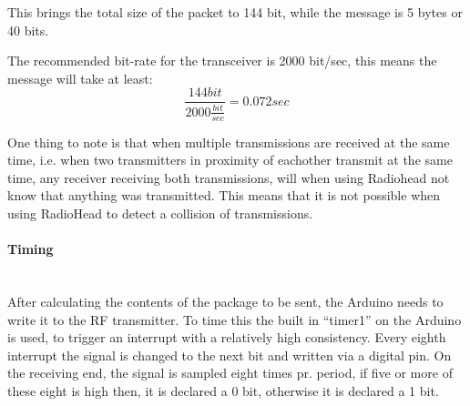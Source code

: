 \begin{table}[ht]
\centering
{}
\caption{A table view of the content of transmitting \enquote{Hello} with RadioHead.}
\label{table:RH}
\end{table}

This brings the total size of the packet to 144 bit, while the message is 5 bytes or 40 bits.

The recommended bit-rate for the transceiver is 2000 bit/sec, this means the message will take at least:
\begin{equation}
\frac{144 bit}{2000 \frac{bit}{sec}} = 0.072 sec
\end{equation}

One thing to note is that when multiple transmissions are received at the same time, i.e. when two transmitters in proximity of eachother transmit at the same time, any receiver receiving both transmissions, will when using Radiohead not know that anything was transmitted.
This means that it is not possible when using RadioHead to detect a collision of transmissions.

\paragraph{Timing} \hfill \\
After calculating the contents of the package to be sent, the Arduino needs to write it to the RF transmitter. 
To time this the built in ``timer1'' on the Arduino is used, to trigger an interrupt with a relatively high consistency.
Every eighth interrupt the signal is changed to the next bit and written via a digital pin. 
On the receiving end, the signal is sampled eight times pr. period, if five or more of these eight is high then, it is declared a 0 bit, otherwise it is declared a 1 bit. %